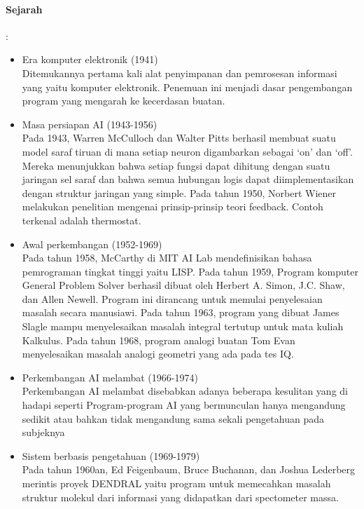 \paragraph{Sejarah}:
\begin{itemize}
    \item Era komputer elektronik (1941) \\
    Ditemukannya pertama kali alat penyimpanan dan pemrosesan informasi yang yaitu komputer elektronik. Penemuan ini menjadi dasar pengembangan program yang mengarah ke kecerdasan buatan.
    
    \item Masa persiapan AI (1943-1956) \\
    Pada 1943, Warren McCulloch dan Walter Pitts berhasil membuat suatu model saraf tiruan di mana setiap neuron digambarkan sebagai ‘on’ dan ‘off’. Mereka menunjukkan bahwa setiap fungsi dapat dihitung dengan suatu jaringan sel saraf dan bahwa semua hubungan logis dapat diimplementasikan dengan struktur jaringan yang simple.
    Pada tahun 1950, Norbert Wiener melakukan penelitian mengenai prinsip-prinsip teori feedback. Contoh terkenal adalah thermostat.
    
    \item Awal perkembangan (1952-1969) \\
    Pada tahun 1958, McCarthy di MIT AI Lab mendefinisikan bahasa pemrograman tingkat tinggi yaitu LISP.
    Pada tahun 1959, Program komputer General Problem Solver berhasil dibuat oleh Herbert A. Simon, J.C. Shaw, dan Allen Newell. Program ini dirancang untuk memulai penyelesaian masalah secara manusiawi.
    Pada tahun 1963, program yang dibuat James Slagle mampu menyelesaikan masalah integral tertutup untuk mata kuliah Kalkulus.
    Pada tahun 1968, program analogi buatan Tom Evan menyelesaikan masalah analogi geometri yang ada pada tes IQ.
    
    \item Perkembangan AI melambat (1966-1974) \\
    Perkembangan AI melambat disebabkan adanya beberapa kesulitan yang di hadapi seperti  Program-program AI yang bermunculan hanya mengandung sedikit atau bahkan tidak mengandung sama sekali pengetahuan pada subjeknya
    
    \item Sistem berbasis pengetahuan (1969-1979) \\
    Pada tahun 1960an, Ed Feigenbaum, Bruce Buchanan, dan Joshua Lederberg merintis proyek DENDRAL yaitu program untuk memecahkan masalah struktur molekul dari informasi yang didapatkan dari spectometer massa.
    

\end{itemize}
